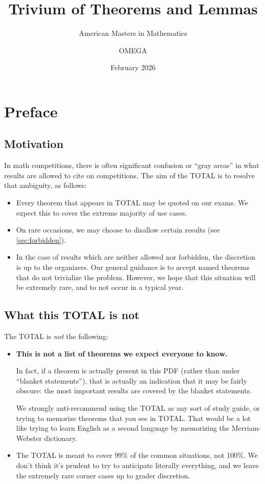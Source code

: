 \documentclass[11pt]{scrartcl}
\begin{document}
\title{Trivium of Theorems and Lemmas}
\subtitle{American Masters in Mathematics}
\author{OMEGA}
\date{February 2026}
\maketitle

\tableofcontents

\section{Preface}
\subsection{Motivation}
In math competitions, there is often significant confusion or ``gray areas''
in what results are allowed to cite on competitions.
The aim of the TOTAL is to resolve that ambiguity, as follows:

\begin{itemize}
  \item Every theorem that appears in TOTAL may be quoted on our exams.
    We expect this to cover the extreme majority of use cases.
  \item On rare occasions, we may choose to disallow certain results
    (see \autoref{sec:forbidden}).
  \item In the case of results which are neither allowed nor forbidden,
    the discretion is up to the organizers.
    Our general guidance is to accept named theorems that do not trivialize the problem.
    However, we hope that this situation will be extremely rare,
    and to not occur in a typical year.
\end{itemize}

\subsection{What this TOTAL is not}
The TOTAL is \emph{not} the following:
\begin{itemize}
  \item \textbf{This is not a list of theorems we expect everyone to know.}

  In fact, if a theorem is actually present in this PDF
  (rather than under ``blanket statements''),
  that is actually an indication that it may be fairly obscure:
  the most important results are covered by the blanket statements.

  We strongly anti-recommend using the TOTAL as any sort of study guide,
  or trying to memorize theorems that you see in TOTAL.
  That would be a lot like trying to learn English as a second language
  by memorizing the Merriam-Webster dictionary.

  \item The TOTAL is meant to cover 99\% of the common situations, not 100\%.
  We don't think it's prudent to try to anticipate literally everything,
  and we leave the extremely rare corner cases up to grader discretion.
\end{itemize}
\end{document}
